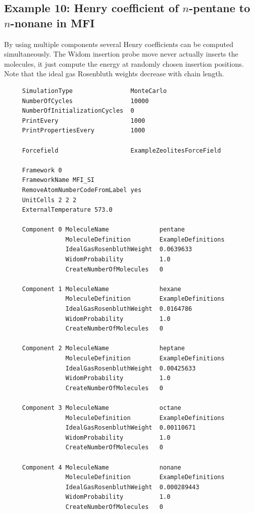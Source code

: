 \subsection*{Example 10: Henry coefficient of $n$-pentane to $n$-nonane in MFI}

By using multiple components several Henry coefficients can be computed simultaneously. The Widom insertion probe move
never actually inserts the molecules, it just compute the energy at randomly chosen insertion positions.
Note that the ideal gas Rosenbluth weights decrease with chain length.

\begin{tiny}
\begin{verbatim}
     SimulationType                MonteCarlo
     NumberOfCycles                10000
     NumberOfInitializationCycles  0
     PrintEvery                    1000
     PrintPropertiesEvery          1000
     
     Forcefield                    ExampleZeolitesForceField
     
     Framework 0
     FrameworkName MFI_SI
     RemoveAtomNumberCodeFromLabel yes
     UnitCells 2 2 2
     ExternalTemperature 573.0
     
     Component 0 MoleculeName              pentane
                 MoleculeDefinition        ExampleDefinitions
                 IdealGasRosenbluthWeight  0.0639633
                 WidomProbability          1.0
                 CreateNumberOfMolecules   0
    
     Component 1 MoleculeName              hexane
                 MoleculeDefinition        ExampleDefinitions
                 IdealGasRosenbluthWeight  0.0164786
                 WidomProbability          1.0
                 CreateNumberOfMolecules   0
     
     Component 2 MoleculeName              heptane
                 MoleculeDefinition        ExampleDefinitions
                 IdealGasRosenbluthWeight  0.00425633
                 WidomProbability          1.0
                 CreateNumberOfMolecules   0
     
     Component 3 MoleculeName              octane
                 MoleculeDefinition        ExampleDefinitions
                 IdealGasRosenbluthWeight  0.00110671
                 WidomProbability          1.0
                 CreateNumberOfMolecules   0
     
     Component 4 MoleculeName              nonane
                 MoleculeDefinition        ExampleDefinitions
                 IdealGasRosenbluthWeight  0.000289443
                 WidomProbability          1.0
                 CreateNumberOfMolecules   0
\end{verbatim}
\end{tiny}

